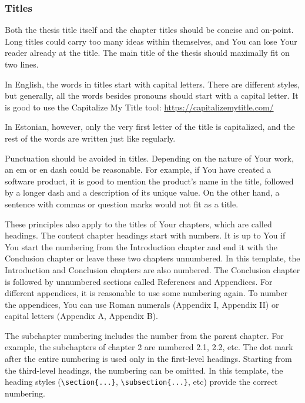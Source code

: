 \subsubsection{Titles}
Both the thesis title itself and the chapter titles should be concise and on-point. Long titles could carry too many ideas within themselves, and You can lose Your reader already at the title. The main title of the thesis should maximally fit on two lines.

In English, the words in titles start with capital letters. There are different styles, but generally, all the words besides pronouns should start with a capital letter. It is good to use the Capitalize My Title tool: \url{https://capitalizemytitle.com/}

In Estonian, however, only the very first letter of the title is capitalized, and the rest of the words are written just like regularly.

Punctuation should be avoided in titles. Depending on the nature of Your work, an em or en dash could be reasonable. For example, if You have created a software product, it is good to mention the product's name in the title, followed by a longer dash and a description of its unique value. On the other hand, a sentence with commas or question marks would not fit as a title.

These principles also apply to the titles of Your chapters, which are called headings. The content chapter headings start with numbers. It is up to You if You start the numbering from the Introduction chapter and end it with the Conclusion chapter or leave these two chapters unnumbered. In this template, the Introduction and Conclusion chapters are also numbered. The Conclusion chapter is followed by unnumbered sections called References and Appendices. For different appendices, it is reasonable to use some numbering again. To number the appendices, You can use Roman numerals (Appendix I, Appendix II) or capital letters (Appendix A, Appendix B). 

The subchapter numbering includes the number from the parent chapter. For example, the subchapters of chapter 2 are numbered 2.1, 2.2, etc. The dot mark after the entire numbering is used only in the first-level headings. Starting from the third-level headings, the numbering can be omitted. In this template, the heading styles (\verb|\section{...}|, \verb|\subsection{...}|, etc) provide the correct numbering.


